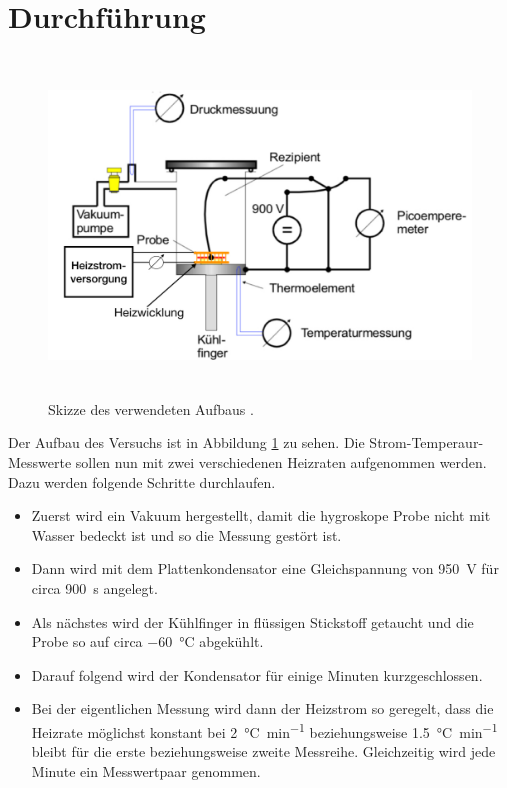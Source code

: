  \section{Durchführung}
\label{sec:Durchführung}

\begin{figure}
  \centering
  \includegraphics[height= 9cm]{BestNippelpiercings/aufbau.pdf}
  \caption{Skizze des verwendeten Aufbaus \cite{anleitung}.}
  \label{fig:aufbau}
\end{figure}
Der Aufbau des Versuchs ist in Abbildung \ref{fig:aufbau} zu sehen. Die Strom-Temperaur-Messwerte sollen nun mit zwei verschiedenen Heizraten aufgenommen werden. Dazu werden folgende Schritte durchlaufen.

\begin{itemize}
  \item Zuerst wird ein Vakuum hergestellt, damit die hygroskope Probe nicht mit Wasser bedeckt ist und so die Messung gestört ist.
  \item Dann wird mit dem Plattenkondensator eine Gleichspannung von \SI{950}{\volt} für circa \SI{900}{\second} angelegt.
  \item Als nächstes wird der Kühlfinger in flüssigen Stickstoff getaucht und die Probe so auf circa \SI{-60}{\celsius} abgekühlt.
  \item Darauf folgend wird der Kondensator für einige Minuten kurzgeschlossen.
  \item Bei der eigentlichen Messung wird dann der Heizstrom so geregelt, dass die Heizrate möglichst konstant bei \SI{2}{\celsius\per\minute} beziehungsweise \SI{1.5}{\celsius\per\minute} bleibt für die erste beziehungsweise zweite Messreihe. Gleichzeitig wird jede Minute ein Messwertpaar genommen.
\end{itemize}
